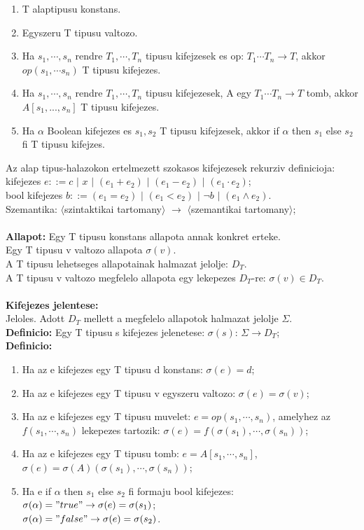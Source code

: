 \documentclass[a4paper,10pt]{article}
\begin{document}
\begin{enumerate}
\item T alaptipusu konstans.
\item Egyszeru T tipusu valtozo.
\item Ha $s_1, \cdots, s_n$ rendre $T_1, \cdots, T_n$ tipusu kifejzesek es op: $T_1 \cdots T_n\to T$, akkor $op(s_1, \cdots s_n)$ T tipusu kifejezes.
\item Ha $s_1, \cdots, s_n$ rendre $T_1, \cdots, T_n$ tipusu kifejezesek, A egy $T_1\cdots T_n \to T$ tomb, akkor $A[s_1, ..., s_n]$ T tipusu kifejezes.
\item Ha $\alpha$ Boolean kifejezes es $s_1, s_2$ T tipusu kifejzesek, akkor if $\alpha$ then $s_1$ else $s_2$ fi T tipusu kifejzes.
\end{enumerate}
Az alap tipus-halazokon ertelmezett szokasos kifejezesek rekurziv definicioja:\\
kifejezes $e::= c$ $\vert$ $x$ $\vert$ $(e_1 + e_2)$ $\vert$ $(e_1 - e_2)$ $\vert$ $(e_1 \cdot e_2)$;\\
bool kifejezes $b::= (e_1 = e_2)$ $\vert$ $(e_1 < e_2)$ $\vert$ $\neg b$ $\vert$ $(e_1 \wedge e_2)$.\\
Szemantika: $\langle$szintaktikai tartomany$\rangle$ $\to$ $\langle$szemantikai tartomany$\rangle$;\\\\
\textbf{Allapot:} Egy T tipusu konstans allapota annak konkret erteke.\\
Egy T tipusu v valtozo allapota $\sigma(v)$.\\
A T tipusu lehetseges allapotainak halmazat jelolje: $D_T$.\\
A T tipusu v valtozo megfelelo allapota egy lekepezes $D_T$-re: $\sigma(v) \in D_T$.\\ \\
\textbf{Kifejezes jelentese:}\\
Jeloles. Adott $D_T$ mellett a megfelelo allapotok halmazat jelolje $\Sigma$.\\
\textbf{Definicio:}  Egy T tipusu s kifejezes jelenetese: $\sigma(s)$: $\Sigma \to D_T$;\\
\textbf{Definicio:}
\begin{enumerate}
\item Ha az e kifejezes egy T tipusu d konstans: $\sigma(e)=d$;
\item Ha az e kifejezes egy T tipusu v egyszeru valtozo: $\sigma(e)=\sigma(v)$;
\item Ha az e kifejezes egy T tipusu muvelet: $e=op(s_1, \cdots, s_n)$, amelyhez az $f(s_1, \cdots, s_n)$ lekepezes tartozik: $\sigma(e)=f(\sigma(s_1), \cdots, \sigma(s_n))$;
\item Ha az e kifejezes egy T tipusu tomb: $e=A[s_1, \cdots, s_n]$, $\sigma(e)=\sigma(A)(\sigma(s_1), \cdots, \sigma(s_n))$;
\item Ha e if $\alpha$ then $s_1$ else $s_2$ fi formaju bool kifejezes:\\
$\sigma(\alpha)="true" \to \sigma(e)=\sigma(s_1)$;\\
$\sigma(\alpha)="false" \to \sigma(e)=\sigma(s_2)$.
\end{enumerate}
\end{document}
